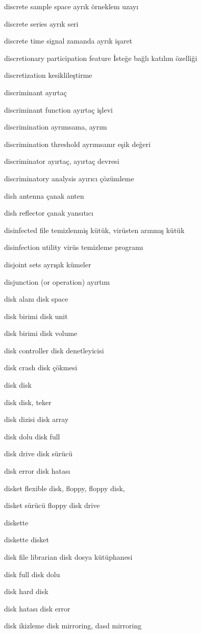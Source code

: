 \documentclass[12pt,fleqn]{article}\usepackage{../../common}
\begin{document}
discrete sample space ayrık örneklem uzayı

discrete series ayrık seri

discrete time signal zamanda ayrık işaret

discretionary participation feature İsteğe bağlı katılım özelliği

discretization kesiklileştirme

discriminant ayırtaç

discriminant function ayırtaç işlevi

discrimination ayrımsama, ayrım

discrimination threshold ayrımsanır eşik değeri

discriminator ayırtaç, ayırtaç devresi

discriminatory analysis ayırıcı çözümleme

dish antenna çanak anten

dish reflector çanak yansıtıcı

disinfected file temizlenmiş kütük, virüsten arınmış kütük

disinfection utility virüs temizleme programı

disjoint sets ayrışık kümeler

disjunction (or operation) ayırtım

disk alanı disk space

disk birimi disk unit

disk birimi disk volume

disk controller disk denetleyicisi

disk crash disk çökmesi

disk disk

disk disk, teker

disk dizisi disk array

disk dolu disk full

disk drive disk sürücü

disk error disk hatası

disket flexible disk, floppy, floppy disk,

disket sürücü floppy disk drive

diskette

diskette disket

disk file librarian disk dosya kütüphanesi

disk full disk dolu

disk hard disk

disk hatası disk error

disk ikizleme disk mirroring, dasd mirroring
\end{document}

